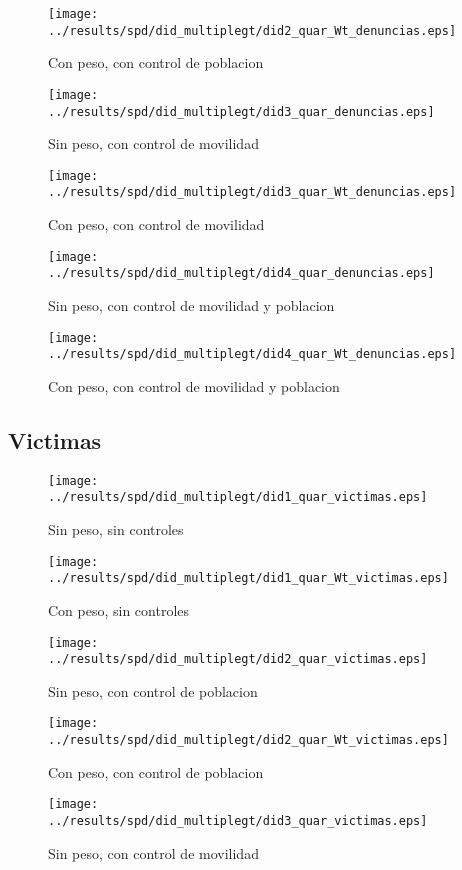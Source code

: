 \documentclass[11pt,letterpaper]{article}
\begin{document}
\begin{figure}[H]
\caption{Con peso, con control de poblacion}
\centering
\texttt{[image: ../results/spd/did\_multiplegt/did2\_quar\_Wt\_denuncias.eps]}
\end{figure}
\begin{figure}[H]
\caption{Sin peso, con control de movilidad}
\centering
\texttt{[image: ../results/spd/did\_multiplegt/did3\_quar\_denuncias.eps]}
\end{figure}

\begin{figure}[H]
\caption{Con peso, con control de movilidad}
\centering
\texttt{[image: ../results/spd/did\_multiplegt/did3\_quar\_Wt\_denuncias.eps]}
\end{figure}
\begin{figure}[H]
\caption{Sin peso, con control de movilidad y poblacion}
\centering
\texttt{[image: ../results/spd/did\_multiplegt/did4\_quar\_denuncias.eps]}
\end{figure}

\begin{figure}[H]
\caption{Con peso, con control de movilidad y poblacion}
\centering
\texttt{[image: ../results/spd/did\_multiplegt/did4\_quar\_Wt\_denuncias.eps]}
\end{figure}

	\subsection{Victimas}
\begin{figure}[H]
\caption{Sin peso, sin controles}
\centering
\texttt{[image: ../results/spd/did\_multiplegt/did1\_quar\_victimas.eps]}
\end{figure}

\begin{figure}[H]
\caption{Con peso, sin controles}
\centering
\texttt{[image: ../results/spd/did\_multiplegt/did1\_quar\_Wt\_victimas.eps]}
\end{figure}
\begin{figure}[H]
\caption{Sin peso, con control de poblacion}
\centering
\texttt{[image: ../results/spd/did\_multiplegt/did2\_quar\_victimas.eps]}
\end{figure}

\begin{figure}[H]
\caption{Con peso, con control de poblacion}
\centering
\texttt{[image: ../results/spd/did\_multiplegt/did2\_quar\_Wt\_victimas.eps]}
\end{figure}
\begin{figure}[H]
\caption{Sin peso, con control de movilidad}
\centering
\texttt{[image: ../results/spd/did\_multiplegt/did3\_quar\_victimas.eps]}
\end{figure}
\end{document}
